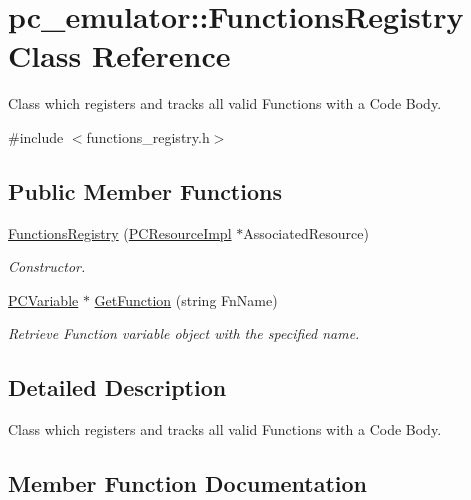 \hypertarget{classpc__emulator_1_1FunctionsRegistry}{}\section{pc\+\_\+emulator\+:\+:Functions\+Registry Class Reference}
\label{classpc__emulator_1_1FunctionsRegistry}


Class which registers and tracks all valid Functions with a Code Body.  




{\ttfamily \#include $<$functions\+\_\+registry.\+h$>$}

\subsection*{Public Member Functions}
\begin{DoxyCompactItemize}
\item 
\hyperlink{classpc__emulator_1_1FunctionsRegistry_a2f91b245b966f4fd6231817829d08ae7}{Functions\+Registry} (\hyperlink{classpc__emulator_1_1PCResourceImpl}{P\+C\+Resource\+Impl} $\ast$Associated\+Resource)\hypertarget{classpc__emulator_1_1FunctionsRegistry_a2f91b245b966f4fd6231817829d08ae7}{}\label{classpc__emulator_1_1FunctionsRegistry_a2f91b245b966f4fd6231817829d08ae7}

\begin{DoxyCompactList}\small\item\em Constructor. \end{DoxyCompactList}\item 
\hyperlink{classpc__emulator_1_1PCVariable}{P\+C\+Variable} $\ast$ \hyperlink{classpc__emulator_1_1FunctionsRegistry_a846c3466af0ab96c5089e9b09c608799}{Get\+Function} (string Fn\+Name)
\begin{DoxyCompactList}\small\item\em Retrieve Function variable object with the specified name. \end{DoxyCompactList}\end{DoxyCompactItemize}


\subsection{Detailed Description}
Class which registers and tracks all valid Functions with a Code Body. 

\subsection{Member Function Documentation}
